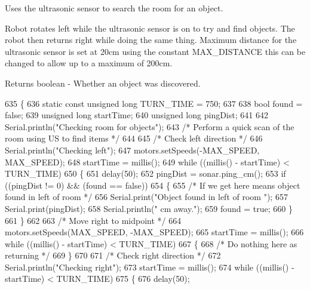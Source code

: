 Uses the ultrasonic sensor to search the room for an object. 

Robot rotates left while the ultrasonic sensor is on to try and find objects. The robot then returns right while doing the same thing. Maximum distance for the ultrasonic sensor is set at 20cm using the constant M\+A\+X\+\_\+\+D\+I\+S\+T\+A\+N\+C\+E this can be changed to allow up to a maximum of 200cm.

\begin{DoxyReturn}{Returns}
boolean -\/ Whether an object was discovered. 
\end{DoxyReturn}

\begin{DoxyCode}
635 \{
636   \textcolor{keyword}{static} \textcolor{keyword}{const} \textcolor{keywordtype}{unsigned} \textcolor{keywordtype}{long} TURN\_TIME = 750;
637 
638   \textcolor{keywordtype}{bool} found = \textcolor{keyword}{false};
639   \textcolor{keywordtype}{unsigned} \textcolor{keywordtype}{long} startTime;
640   \textcolor{keywordtype}{unsigned} \textcolor{keywordtype}{long} pingDist;
641 
642   Serial.println(\textcolor{stringliteral}{"Checking room for objects"});
643   \textcolor{comment}{/* Perform a quick scan of the room using US to find items */}
644 
645   \textcolor{comment}{/* Check left direction */}
646   Serial.println(\textcolor{stringliteral}{"Checking left"});
647   motors.setSpeeds(-MAX\_SPEED, MAX\_SPEED);
648   startTime = millis();
649   \textcolor{keywordflow}{while} ((millis() - startTime) < TURN\_TIME)
650   \{
651     delay(50);
652     pingDist = sonar.ping\_cm();
653     \textcolor{keywordflow}{if} ((pingDist != 0) && (found == \textcolor{keyword}{false}))
654     \{
655       \textcolor{comment}{/* If we get here means object found in left of room */}
656       Serial.print(\textcolor{stringliteral}{"Object found in left of room "});
657       Serial.print(pingDist);
658       Serial.println(\textcolor{stringliteral}{" cm away."});
659       found = \textcolor{keyword}{true};
660     \}
661   \}
662 
663   \textcolor{comment}{/* Move right to midpoint */}
664   motors.setSpeeds(MAX\_SPEED, -MAX\_SPEED);
665   startTime = millis();
666   \textcolor{keywordflow}{while} ((millis() - startTime) < TURN\_TIME)
667   \{
668     \textcolor{comment}{/* Do nothing here as returning */}
669   \}
670 
671   \textcolor{comment}{/* Check right direction */}
672   Serial.println(\textcolor{stringliteral}{"Checking right"});
673   startTime = millis();
674   \textcolor{keywordflow}{while} ((millis() - startTime) < TURN\_TIME)
675   \{
676     delay(50);

\end{DoxyCode}
